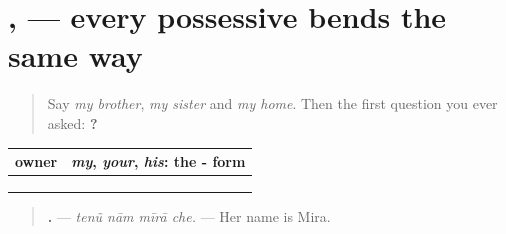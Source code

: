 \section[\texorpdfstring{\gu{તારું} · \gu{તેનું} · \gu{અમારું} … (tārũ · tenũ …)}{તારું · તેનું · અમારું … (tārũ · tenũ …)}]{ ,   — every possessive bends the same way}

\label{lesson:GU-C146-tamaro}



\begin{quote}
Say \emph{my brother}, \emph{my sister} and \emph{my home}. Then the first question you ever asked: \textbf{   ?}
\end{quote}

\begin{grammarlens}[title={Grammar Lens: one owner}]
\noindent
\begin{tabularx}{\linewidth}{@{}>{\raggedright\arraybackslash}X>{\raggedright\arraybackslash}X@{}}
\toprule
\textbf{owner} & \textbf{\emph{my}, \emph{your}, \emph{his}: the -\gu{ું} form} \\
\midrule
\gu{હું} & \gu{મારું} \\
\gu{તું} & \gu{તારું} \\
\gu{તે} & \gu{તેનું} \\
\bottomrule
\end{tabularx}

\begin{quote}
\textbf{   .} — \emph{tenũ nām mīrā che.} — Her name is Mira.
\end{quote}
\end{grammarlens}

